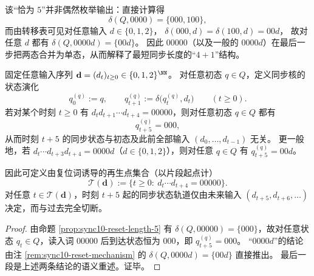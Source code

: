 \begin{remark}\label{rem:sync10-reset-mechanism}
该“恰为 $5$”并非偶然枚举输出：直接计算得
\[
\delta(Q,0000)=\{000,100\},
\]
而由转移表可见对任意输入 $d\in\{0,1,2\}$，
\(
\delta(000,d)=\delta(100,d)=00d
\)，
故对任意 $d$ 都有
\(
\delta(Q,0000d)=\{00d\}
\)。
因此 $00000$（以及一般的 $0000d$）在最后一步把两态合并为单态，从而解释了最短同步长度的“$4+1$”结构。
\end{remark}

\begin{proposition}\label{prop:sync10-regeneration}
固定任意输入序列 \(\mathbf d=(d_t)_{t\ge 0}\in\{0,1,2\}^{\NN}\)。
对任意初态 \(q\in Q\)，定义同步核的状态演化
\[
q^{(q)}_0:=q,\qquad q^{(q)}_{t+1}:=\delta\!\bigl(q^{(q)}_t,d_t\bigr)\qquad(t\ge 0).
\]
若对某个时刻 \(t\ge 0\) 有 \(d_t d_{t+1}\cdots d_{t+4}=00000\)，则对任意初态 \(q\in Q\) 都有
\[
q^{(q)}_{t+5}=000,
\]
从而时刻 \(t+5\) 的同步状态与初态及此前全部输入 \((d_0,\dots,d_{t-1})\) 无关。
更一般地，若 \(d_t\cdots d_{t+3}d_{t+4}=0000d\)（\(d\in\{0,1,2\}\)），则对任意 \(q\in Q\) 有 \(q^{(q)}_{t+5}=00d\)。
\par
因此可定义由复位词诱导的再生点集合（以片段起点计）
\[
\mathcal T(\mathbf d):=\{t\ge 0:\ d_t\cdots d_{t+4}=00000\}.
\]
对任意 \(t\in\mathcal T(\mathbf d)\)，时刻 \(t+5\) 起的同步状态轨道仅由未来输入 \((d_{t+5},d_{t+6},\dots)\) 决定，而与过去完全切断。
\end{proposition}
\begin{proof}
由命题 \ref{prop:sync10-reset-length-5} 有 \(\delta(Q,00000)=\{000\}\)，故对任意状态 \(q_t\in Q\)，读入词 \(00000\) 后到达状态恒为 \(000\)，即 \(q^{(q)}_{t+5}=000\)。
“\(0000d\)”的结论由注 \ref{rem:sync10-reset-mechanism} 的 \(\delta(Q,0000d)=\{00d\}\) 直接推出。
最后一段是上述两条结论的语义重述。证毕。
\end{proof}

